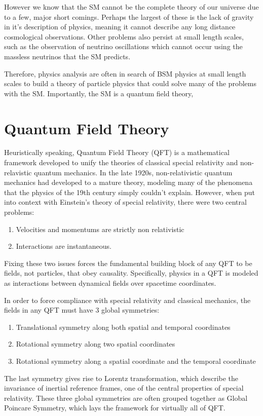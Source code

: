 However we know that the SM cannot be the complete theory of our universe due to a few, major short comings. Perhaps the largest of these is the lack of gravity in it's description of physics, meaning it cannot describe any long distance cosmological observations. Other problems also persist at small length scales, such as the observation of neutrino oscillations \cite{ref:duan2010collective} which cannot occur using the massless neutrinos that the SM predicts. 

Therefore, physics analysis are often in search of BSM physics at small length scales to build a theory of particle physics that could solve many of the problems with the SM. Importantly, the SM is a quantum field theory, 

\section{Quantum Field Theory \cite{ref:harlow2024}}

Heuristically speaking, Quantum Field Theory (QFT) is a mathematical framework developed to unify the theories of classical special relativity and non-relavistic quantum mechanics. In the late 1920s, non-relativistic quantum mechanics had developed to a mature theory, modeling many of the phenomena that the physics of the 19th century simply couldn't explain. However, when put into context with Einstein's theory of special relativity, there were two central problems: 
\begin{enumerate}
    \item Velocities and momentums are strictly non relativistic 
    \item Interactions are instantaneous. 
\end{enumerate}
Fixing these two issues forces the fundamental building block of any QFT to be fields, not particles, that obey causality. Specifically, physics in a QFT is modeled as interactions between dynamical fields over spacetime coordinates.

In order to force compliance with special relativity and classical mechanics, the fields in any QFT must have 3 global symmetries:
\begin{enumerate}
    \item Translational symmetry along both spatial and temporal coordinates
    \item Rotational symmetry along two spatial coordinates
    \item Rotational symmetry along a spatial coordinate and the temporal coordinate
\end{enumerate}
The last symmetry gives rise to Lorentz transformation, which describe the invariance of inertial reference frames, one of the central properties of special relativity. These three global symmetries are often grouped together as Global Poincare Symmetry, which lays the framework for virtually all of QFT.

